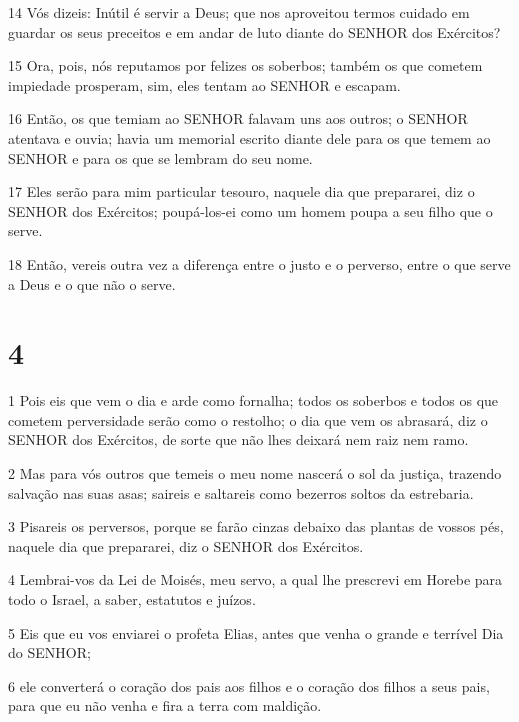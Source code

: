 \par 14 Vós dizeis: Inútil é servir a Deus; que nos aproveitou termos cuidado em guardar os seus preceitos e em andar de luto diante do SENHOR dos Exércitos?
\par 15 Ora, pois, nós reputamos por felizes os soberbos; também os que cometem impiedade prosperam, sim, eles tentam ao SENHOR e escapam.
\par 16 Então, os que temiam ao SENHOR falavam uns aos outros; o SENHOR atentava e ouvia; havia um memorial escrito diante dele para os que temem ao SENHOR e para os que se lembram do seu nome.
\par 17 Eles serão para mim particular tesouro, naquele dia que prepararei, diz o SENHOR dos Exércitos; poupá-los-ei como um homem poupa a seu filho que o serve.
\par 18 Então, vereis outra vez a diferença entre o justo e o perverso, entre o que serve a Deus e o que não o serve.

\chapter{4}

\par 1 Pois eis que vem o dia e arde como fornalha; todos os soberbos e todos os que cometem perversidade serão como o restolho; o dia que vem os abrasará, diz o SENHOR dos Exércitos, de sorte que não lhes deixará nem raiz nem ramo.
\par 2 Mas para vós outros que temeis o meu nome nascerá o sol da justiça, trazendo salvação nas suas asas; saireis e saltareis como bezerros soltos da estrebaria.
\par 3 Pisareis os perversos, porque se farão cinzas debaixo das plantas de vossos pés, naquele dia que prepararei, diz o SENHOR dos Exércitos.
\par 4 Lembrai-vos da Lei de Moisés, meu servo, a qual lhe prescrevi em Horebe para todo o Israel, a saber, estatutos e juízos.
\par 5 Eis que eu vos enviarei o profeta Elias, antes que venha o grande e terrível Dia do SENHOR;
\par 6 ele converterá o coração dos pais aos filhos e o coração dos filhos a seus pais, para que eu não venha e fira a terra com maldição.


